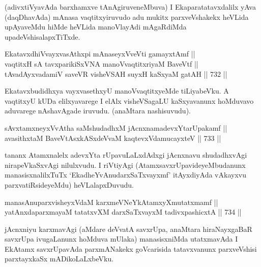 \begin{artha} 
(adivxtiVyavAda barxhamxve tAnAgiruveneMbuva) I Ekaparatatavxdalilx 
yAva (daqDhavAda) mAnasa vaqtitxyiruvudo adu mukitx parxveVshakekx 
heVLida upAyaveMdu hiMde heVLida manoVlayAdi mAgaRdiMda 
upadeVshisalapxTiTxde.
\end{artha}


\begin{shl}
EkatavxdhiVvayxvasAthx\s pi mAnaseyxVveVti gamayxtAmf ||  \\
vaqtitxH sA tavxparikiSxVNA manoVvaqtitxriyaM BaveVtf || \\
tAvadAyxvadamiV saveVR visheVSAH suyxH kaSxyaM gatAH \hfill || 732 ||  
\end{shl}

\begin{artha} 
Ekatavxbudidhxya vayxvasethxyU manoVvaqtitxyeMde tiLiyabeVku. A 
vaqtitxyU kUDa elilxyavarege I elAlx visheVSagaLU kaSxyavanunx hoMduvavo 
aduvarege nAshavAgade iruvudu. (anaMtara nashisuvudu).
\end{artha}


\begin{shl}
sAvxtamxneyxVvAtha saMshudadhxM jAcnxnamadevxYtarUpakamf || \\
avasithxtaM BaveVtAsxkASxdeVvaM kaqtevxVdamucayxteV \hfill || 733 ||  
\end{shl}

\begin{artha} 
tananx Atamxnalelx adevxYta rUpavuLaLxdAdxgi jAcnxnavu shudadhxvAgi 
nirapeVkaSxvAgi nilulxvudu. I riVtiyAgi (AtamxsavxrUpavideyeMbudanunx 
manasisxnalilxTuTx `EkadheYvAnudarxSaTxvayxmf' itAyxdiyAda vAkayxvu 
parxvatiRsideyeMdu) heVLalapxDuvudu.
\end{artha}


\begin{shl}
manasA\s nuparxvisheyxVdaM karxmeVNeYkAtamxyXmutatxmamf || \\
yatAnxdaparxmayaM tatatxvXM darxSaTxvayxM tadivxpashicxtA \hfill || 734 ||  
\end{shl}

\begin{artha} 
jAcnxniyu karxmavAgi (aMdare deVvatA savxrUpa, anaMtara hiraNayxgaBaR 
savxrUpa ivugaLanunx hoMduva mUlaka) manasisxniMda utatxmavAda I 
EkAtamx savxrUpavAda parxmANakekx goVcarisida tatavxvanunx 
parxveVshisi parxtayxkaSx mADikoLaLxbeVku.
\end{artha}

